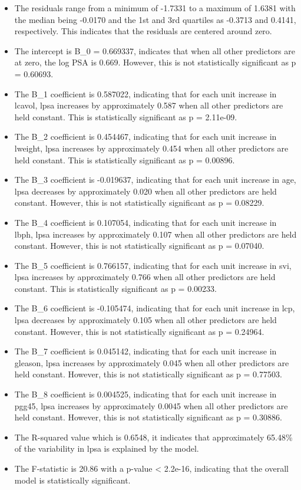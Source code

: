\documentclass[
  letterpaper,
  DIV=11,
  numbers=noendperiod]{scrartcl}
\begin{document}
\begin{itemize}
\item
  The residuals range from a minimum of -1.7331 to a maximum of 1.6381
  with the median being -0.0170 and the 1st and 3rd quartiles as -0.3713
  and 0.4141, respectively. This indicates that the residuals are
  centered around zero.
\item
  The intercept is B\_0 = 0.669337, indicates that when all other
  predictors are at zero, the log PSA is 0.669. However, this is not
  statistically significant as p = 0.60693.
\item
  The B\_1 coefficient is 0.587022, indicating that for each unit
  increase in lcavol, lpsa increases by approximately 0.587 when all
  other predictors are held constant. This is statistically significant
  as p = 2.11e-09.
\item
  The B\_2 coefficient is 0.454467, indicating that for each unit
  increase in lweight, lpsa increases by approximately 0.454 when all
  other predictors are held constant. This is statistically significant
  as p = 0.00896.
\item
  The B\_3 coefficient is -0.019637, indicating that for each unit
  increase in age, lpsa decreases by approximately 0.020 when all other
  predictors are held constant. However, this is not statistically
  significant as p = 0.08229.
\item
  The B\_4 coefficient is 0.107054, indicating that for each unit
  increase in lbph, lpsa increases by approximately 0.107 when all other
  predictors are held constant. However, this is not statistically
  significant as p = 0.07040.
\item
  The B\_5 coefficient is 0.766157, indicating that for each unit
  increase in svi, lpsa increases by approximately 0.766 when all other
  predictors are held constant. This is statistically significant as p =
  0.00233.
\item
  The B\_6 coefficient is -0.105474, indicating that for each unit
  increase in lcp, lpsa decreases by approximately 0.105 when all other
  predictors are held constant. However, this is not statistically
  significant as p = 0.24964.
\item
  The B\_7 coefficient is 0.045142, indicating that for each unit
  increase in gleason, lpsa increases by approximately 0.045 when all
  other predictors are held constant. However, this is not statistically
  significant as p = 0.77503.
\item
  The B\_8 coefficient is 0.004525, indicating that for each unit
  increase in pgg45, lpsa increases by approximately 0.0045 when all
  other predictors are held constant. However, this is not statistically
  significant as p = 0.30886.
\item
  The R-squared value which is 0.6548, it indicates that approximately
  65.48\% of the variability in lpsa is explained by the model.
\item
  The F-statistic is 20.86 with a p-value \textless{} 2.2e-16,
  indicating that the overall model is statistically significant.
\end{itemize}
\end{document}

